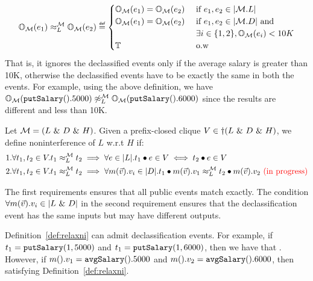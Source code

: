 \documentclass[acmsmall,screen,review, nonacm]{acmart}
\begin{document}
\begin{example}
  \[
  \ob{e_1}{\classpart}{L} \obsim{L}{\classpart} \ob{e_2}{\classpart}{L} \isdef \begin{cases}
    \ob{e_1}{\classpart}{L} = \ob{e_2}{\classpart}{L} &\mbox{ if } e_1, e_2 \in \abs{\classpart.L} \\
    \ob{e_1}{\classpart}{L} = \ob{e_2}{\classpart}{L} &\mbox{ if } e_1, e_2 \in \abs{\classpart.D} \text{ and} \\
     &\mbox{ } \exists i \in \{1, 2\}, \ob{e_i}{\classpart}{L} < 10K \\
    \true &\mbox{ o.w }
  \end{cases}
  \]
  That is, it ignores the declassified events only if the average salary is greater than 10K, otherwise the declassified events have to be exactly the same in both the events.
  For example, using the above definition, we have $\ob{\mycode{putSalary}().5000}{\classpart}{L} \not \obsim{L}{\classpart} \ob{\mycode{putSalary}().6000}{\classpart}{L}$ since the results are different and less than 10K.
\end{example}


\begin{definition}\label{def:relaxni}
   Let $\classpart = (L \directprod D \directprod H)$. Given a prefix-closed clique $V \in \dagger(L \directprod D \directprod H)$, we define noninterference of $L$ w.r.t $H$ if:
  \begin{align*}
   & 1. \forall t_1, t_2 \in V. \treq{t_1}{t_2}{L}{\classpart}  \implies \forall e \in \abs{L}. t_1  \tracecat e \in V \iff t_2 \tracecat e \in V  \\
   & 2. \forall t_1, t_2 \in V. \treq{t_1}{t_2}{L}{\classpart}  \implies \forall m(\vec{v}).v_i \in \abs{D}. \treq{t_1  \tracecat  m(\vec{v}).v_1}{t_2 \tracecat  m(\vec{v}).v_2}{L}{\classpart} \text{  \textcolor{red}{(in progress)}}
  \end{align*}
\end{definition}

The first requirements ensures that all public events match exactly.
The condition $\forall m(\vec{v}).v_i \in \abs{L \directprod D}$ in the second requirement ensures that the declassification event has the same inputs but may have different outputs.

Definition~\ref{def:relaxni} can admit declassification events. For example, if $t_1 = \mycode{putSalary}(1, 5000)$ and  $t_1 = \mycode{putSalary}(1, 6000)$, then we have that .
However, if $m().v_1=\mycode{avgSalary}().5000$ and  $m().v_2 = \mycode{avgSalary}().6000$, then  satisfying Definition~\ref{def:relaxni}.


\begin{definition}\label{def:ni2}

  \mytodo{\dots}
  
\end{definition}





\end{document}
